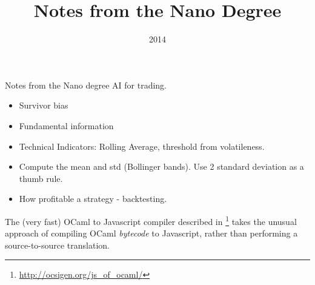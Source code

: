 \documentclass[a4paper]{tufte-handout}
\title{Notes from the Nano Degree}
\date{2014}
\begin{document}
\maketitle


\begin{projects}
    \begin{description}
        \item Notes from the Nano degree AI for trading.
    \end{description}
\end{projects}




\begin{itemize}
    \item Survivor bias
    \item Fundamental information
    \item Technical Indicators: Rolling Average, threshold from volatileness.
    \item Compute the mean and std (Bollinger bands). Use 2 standard deviation as a thumb rule.
    \item How profitable a strategy - backtesting.
\end{itemize}

\hrulefill



The (very fast) OCaml to Javascript compiler described in \citep{VouillonBalat13}\footnote{\url{http://ocsigen.org/js_of_ocaml/}} takes the unusual approach of compiling OCaml \textit{bytecode} to Javascript, rather than performing a source-to-source translation.

\hrulefill








\end{document}
